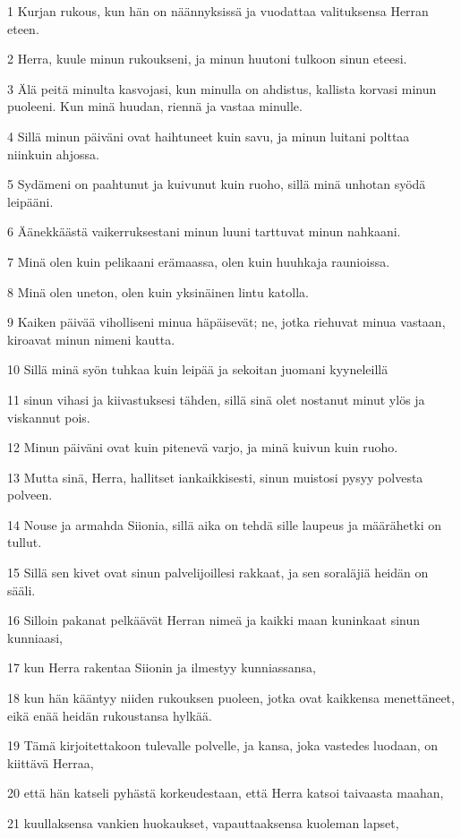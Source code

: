 \par 1 Kurjan rukous, kun hän on näännyksissä ja vuodattaa valituksensa Herran eteen.
\par 2 Herra, kuule minun rukoukseni, ja minun huutoni tulkoon sinun eteesi.
\par 3 Älä peitä minulta kasvojasi, kun minulla on ahdistus, kallista korvasi minun puoleeni. Kun minä huudan, riennä ja vastaa minulle.
\par 4 Sillä minun päiväni ovat haihtuneet kuin savu, ja minun luitani polttaa niinkuin ahjossa.
\par 5 Sydämeni on paahtunut ja kuivunut kuin ruoho, sillä minä unhotan syödä leipääni.
\par 6 Äänekkäästä vaikerruksestani minun luuni tarttuvat minun nahkaani.
\par 7 Minä olen kuin pelikaani erämaassa, olen kuin huuhkaja raunioissa.
\par 8 Minä olen uneton, olen kuin yksinäinen lintu katolla.
\par 9 Kaiken päivää viholliseni minua häpäisevät; ne, jotka riehuvat minua vastaan, kiroavat minun nimeni kautta.
\par 10 Sillä minä syön tuhkaa kuin leipää ja sekoitan juomani kyyneleillä
\par 11 sinun vihasi ja kiivastuksesi tähden, sillä sinä olet nostanut minut ylös ja viskannut pois.
\par 12 Minun päiväni ovat kuin pitenevä varjo, ja minä kuivun kuin ruoho.
\par 13 Mutta sinä, Herra, hallitset iankaikkisesti, sinun muistosi pysyy polvesta polveen.
\par 14 Nouse ja armahda Siionia, sillä aika on tehdä sille laupeus ja määrähetki on tullut.
\par 15 Sillä sen kivet ovat sinun palvelijoillesi rakkaat, ja sen soraläjiä heidän on sääli.
\par 16 Silloin pakanat pelkäävät Herran nimeä ja kaikki maan kuninkaat sinun kunniaasi,
\par 17 kun Herra rakentaa Siionin ja ilmestyy kunniassansa,
\par 18 kun hän kääntyy niiden rukouksen puoleen, jotka ovat kaikkensa menettäneet, eikä enää heidän rukoustansa hylkää.
\par 19 Tämä kirjoitettakoon tulevalle polvelle, ja kansa, joka vastedes luodaan, on kiittävä Herraa,
\par 20 että hän katseli pyhästä korkeudestaan, että Herra katsoi taivaasta maahan,
\par 21 kuullaksensa vankien huokaukset, vapauttaaksensa kuoleman lapset,

